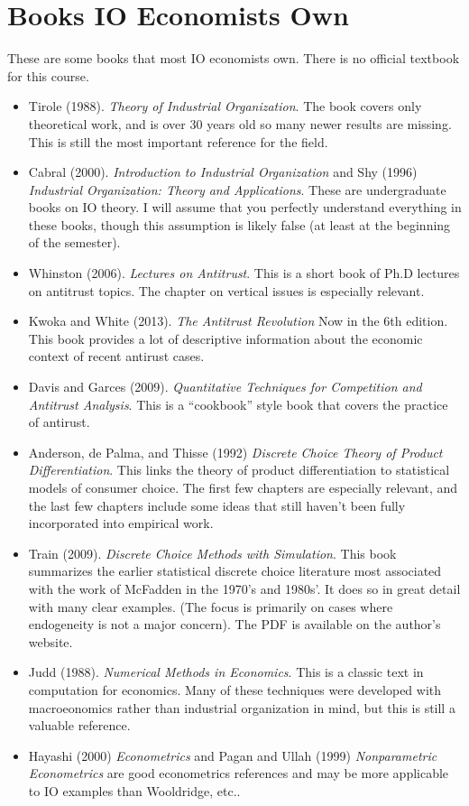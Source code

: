 \documentclass[11pt]{article}
\begin{document}
\section*{Books IO Economists Own}
These are some books that most IO economists own. There is no official textbook for this course.
\begin{itemize}
\item Tirole (1988). \textit{Theory of Industrial Organization}. The book covers only theoretical work, and is over 30 years old so many newer results are missing. This is still the most important reference for the field.
\item Cabral (2000). \textit{Introduction to Industrial Organization} and Shy (1996) \textit{Industrial Organization: Theory and Applications}. These are undergraduate books on IO theory. I will assume that you perfectly understand everything in these books, though this assumption is likely false (at least at the beginning of the semester).
\item Whinston (2006). \textit{Lectures on Antitrust}. This is a short book of Ph.D lectures on antitrust topics. The chapter on vertical issues is especially relevant.
\item Kwoka and White (2013). \textit{The Antitrust Revolution} Now in the 6th edition. This book provides a lot of descriptive information about the economic context of recent antirust cases.
\item Davis and Garces (2009). \textit{Quantitative Techniques for Competition and Antitrust Analysis}. This is a ``cookbook'' style book that covers the practice of antirust.
\item Anderson, de Palma, and Thisse (1992) \textit{Discrete Choice Theory of Product Differentiation}. This links the theory of product differentiation to statistical models of consumer choice. The first few chapters are especially relevant, and the last few chapters include some ideas that still haven't been fully incorporated into empirical work.
\item Train (2009). \textit{Discrete Choice Methods with Simulation}. This book summarizes the earlier statistical discrete choice literature most associated with the work of McFadden in the 1970's and 1980s'. It does so in great detail with many clear examples. (The focus is primarily on cases where endogeneity is not a major concern). The PDF is available on the author's website.
\item Judd (1988). \textit{Numerical Methods in Economics}. This is a classic text in computation for economics. Many of these techniques were developed with macroeonomics rather than industrial organization in mind, but this is still a valuable reference.
\item Hayashi (2000) \textit{Econometrics} and Pagan and Ullah (1999) \textit{Nonparametric Econometrics} are good econometrics references and may be more applicable to IO examples than Wooldridge, etc.. 
\end{itemize} 
\end{document}
